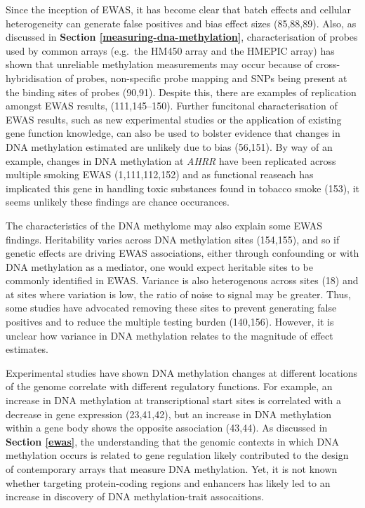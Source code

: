 \documentclass[11pt,oneside]{bristolthesis}
\begin{document}
Since the inception of EWAS, it has become clear that batch effects and cellular heterogeneity can generate false positives and bias effect sizes (85,88,89). Also, as discussed in \textbf{Section \ref{measuring-dna-methylation}}, characterisation of probes used by common arrays (e.g.~the HM450 array and the HMEPIC array) has shown that unreliable methylation measurements may occur because of cross-hybridisation of probes, non-specific probe mapping and SNPs being present at the binding sites of probes (90,91). Despite this, there are examples of replication amongst EWAS results, (111,145--150). Further funcitonal characterisation of EWAS results, such as new experimental studies or the application of existing gene function knowledge, can also be used to bolster evidence that changes in DNA methylation estimated are unlikely due to bias (56,151). By way of an example, changes in DNA methylation at \emph{AHRR} have been replicated across multiple smoking EWAS (1,111,112,152) and as functional reaseach has implicated this gene in handling toxic substances found in tobacco smoke (153), it seems unlikely these findings are chance occurances.

The characteristics of the DNA methylome may also explain some EWAS findings. Heritability varies across DNA methylation sites (154,155), and so if genetic effects are driving EWAS associations, either through confounding or with DNA methylation as a mediator, one would expect heritable sites to be commonly identified in EWAS. Variance is also heterogenous across sites (18) and at sites where variation is low, the ratio of noise to signal may be greater. Thus, some studies have advocated removing these sites to prevent generating false positives and to reduce the multiple testing burden (140,156). However, it is unclear how variance in DNA methylation relates to the magnitude of effect estimates.

Experimental studies have shown DNA methylation changes at different locations of the genome correlate with different regulatory functions. For example, an increase in DNA methylation at transcriptional start sites is correlated with a decrease in gene expression (23,41,42), but an increase in DNA methylation within a gene body shows the opposite association (43,44). As discussed in \textbf{Section \ref{ewas}}, the understanding that the genomic contexts in which DNA methylation occurs is related to gene regulation likely contributed to the design of contemporary arrays that measure DNA methylation. Yet, it is not known whether targeting protein-coding regions and enhancers has likely led to an increase in discovery of DNA methylation-trait assocaitions.
\end{document}
